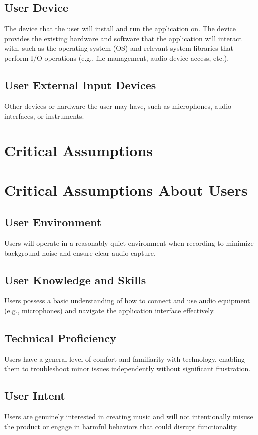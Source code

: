 \documentclass{article}
\begin{document}
\subsection{User Device}
The device that the user will install and run the application on. The device provides the existing hardware and software that the 
application will interact with, such as the operating system (OS) and relevant system libraries that perform I/O operations (e.g., 
file management, audio device access, etc.).

\subsection{User External Input Devices}
Other devices or hardware the user may have, such as microphones, audio interfaces, or instruments.

\section{Critical Assumptions}

\section*{Critical Assumptions About Users}

\subsection*{User Environment}
Users will operate in a reasonably quiet environment when recording to minimize background noise and ensure clear audio capture.

\subsection*{User Knowledge and Skills}
Users possess a basic understanding of how to connect and use audio equipment (e.g., microphones) and navigate the application interface effectively.

\subsection*{Technical Proficiency}
Users have a general level of comfort and familiarity with technology, enabling them to troubleshoot minor issues independently without significant frustration.

\subsection*{User Intent}
Users are genuinely interested in creating music and will not intentionally misuse the product or engage in harmful behaviors that could disrupt functionality.
\end{document}
